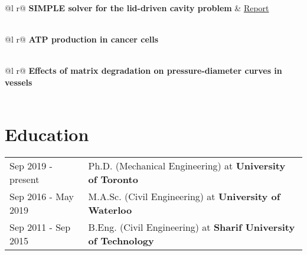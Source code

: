 \documentclass[a4paper,11pt]{article}
\begin{document}
\begin{tabularx}{\linewidth}{ @{}l r@{} }
\textbf{SIMPLE solver for the lid-driven cavity problem} & \hfill \href{https://drive.google.com/file/d/1zjLmS6348FML_2pIGlLAlGnuICDzmDFs/view?usp=sharing}{Report} \\[3.75pt]
  \\
\end{tabularx}

\begin{tabularx}{\linewidth}{ @{}l r@{} }
\textbf{ATP production in cancer cells}\\[3.75pt]
  \\
\end{tabularx}

\begin{tabularx}{\linewidth}{ @{}l r@{} }
\textbf{Effects of matrix degradation on pressure-diameter curves in  vessels} \\[3.75pt]
  \\
\end{tabularx}

\section{Education}
\begin{tabularx}{\linewidth}{@{}l X@{}}	
Sep 2019 - present & Ph.D. (Mechanical Engineering) at \textbf{University of Toronto}  \\

Sep 2016 - May 2019 & M.A.Sc. (Civil Engineering) at \textbf{University of Waterloo} \\ 

Sep 2011 - Sep 2015 & B.Eng. (Civil Engineering) at \textbf{Sharif University of Technology}\\

\end{tabularx}
\end{document}
